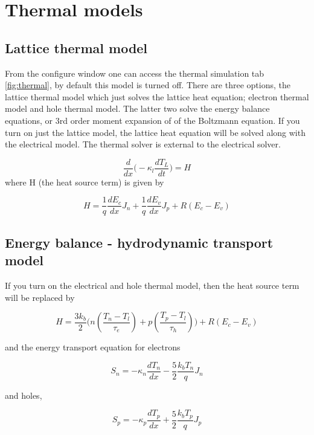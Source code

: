 \section{Thermal models}
\subsection{Lattice thermal model}
From the configure window one can access the thermal simulation tab \ref{fig:thermal}, by default this model is turned off.  There are three options, the lattice thermal model which just solves the lattice heat equation; electron thermal model and hole thermal model.  The latter two solve the energy balance equations, or 3rd order moment expansion of of the Boltzmann equation.  If you turn on just the lattice model, the lattice heat equation will be solved along with the electrical model.  The thermal solver is external to the electrical solver. 

\begin{equation}
 \frac{d}{dx}\Bigg(-  \kappa_{l} \frac{dT_{L}}{dt}\Bigg)=H
\end{equation}
where H (the heat source term) is given by

\begin{equation}
H=\frac{1}{q}\frac{dE_{c}}{dx} J_{n}+\frac{1}{q}\frac{dE_{v}}{dx} J_{p}+R(E_{c}-E_{v})
\end{equation}

\subsection{Energy balance - hydrodynamic transport model}

If you turn on the electrical and hole thermal model, then the heat source term will be replaced by

\begin{equation}
H=\frac{3 k_{b}}{2} \Bigg ( n (\frac{T_{n}-T_{l}}{\tau_{e}}) + p (\frac{T_{p}-T_{l}}{\tau_{h}})\Bigg) +R(E_{c}-E_{v})
\end{equation}

and the energy transport equation for electrons

\begin{equation}
S_n=-\kappa_n \frac{dT_{n}}{dx}-\frac{5}{2} \frac{k_{b}T_{n}}{q} J_{n}
\end{equation}

and holes,

\begin{equation}
S_p=-\kappa_p \frac{dT_{p}}{dx}+\frac{5}{2} \frac{k_{b}T_{p}}{q} J_{p}
\end{equation}

